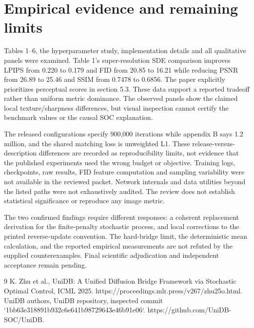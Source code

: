 \documentclass[10pt]{article}
\begin{document}
\section*{Empirical evidence and remaining limits}
Tables 1–6, the hyperparameter study, implementation details and all qualitative panels were examined. Table 1’s super-resolution SDE comparison improves LPIPS from 0.220 to 0.179 and FID from 20.85 to 16.21 while reducing PSNR from 26.89 to 25.46 and SSIM from 0.7478 to 0.6856. The paper explicitly prioritizes perceptual scores in section 5.3. These data support a reported tradeoff rather than uniform metric dominance. The observed panels show the claimed local texture/sharpness differences, but visual inspection cannot certify the benchmark values or the causal SOC explanation.\par
The released configurations specify 900,000 iterations while appendix B says 1.2 million, and the shared matching loss is unweighted L1. These release-versus-description differences are recorded as reproducibility limits, not evidence that the published experiments used the wrong budget or objective. Training logs, checkpoints, raw results, FID feature computation and sampling variability were not available in the reviewed packet. Network internals and data utilities beyond the listed paths were not exhaustively audited. The review does not establish statistical significance or reproduce any image metric.\par
The two confirmed findings require different responses: a coherent replacement derivation for the finite-penalty stochastic process, and local corrections to the printed reverse-update convention. The hard-bridge limit, the deterministic mean calculation, and the reported empirical measurements are not refuted by the supplied counterexamples. Final scientific adjudication and independent acceptance remain pending.\par
9 K. Zhu et al., UniDB: A Unified Diffusion Bridge Framework via Stochastic Optimal Control, ICML 2025. https://proceedings.mlr.press/v267/zhu25o.html. UniDB authors, UniDB repository, inspected commit `1bb63e318891b932c6e641b98729643e46b91e06`. https://github.com/UniDB-SOC/UniDB.\par
\end{document}
